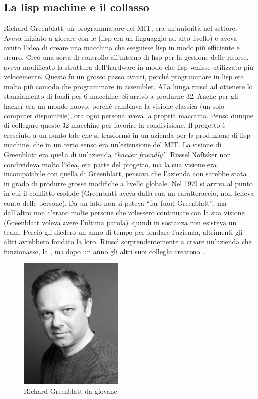 \subsection{La lisp machine e il collasso}

Richard Greenblatt, un programmatore del MIT, era un'autorità nel settore. Aveva iniziato a giocare con le  (lisp era un linguaggio ad alto livello) e aveva avuto l'idea di creare una macchina che eseguisse lisp in modo più efficiente e sicuro. Creò una sorta di controllo all'interno di lisp per la gestione delle risorse, aveva modificato la struttura dell'hardware in modo che lisp venisse utilizzato più velocemente. Questo fu un grosso passo avanti, perché programmare in lisp era molto più comodo che programmare in assembler. Alla lunga riuscì ad ottenere lo stanziamento di fondi per 6 macchine. Si arrivò a produrne 32. Anche per gli hacker era un mondo nuovo, perché cambiava la visione classica (un solo computer disponibile), ora ogni persona aveva la propria macchina. Pensò dunque di collegare queste 32 macchine per favorire la condivisione. Il progetto è cresciuto a un punto tale che si trasformò in un azienda per la produzione di lisp machine, che in un certo senso era un'estensione del MIT. La visione di Greenblatt era quella di un'azienda \textit{``hacker friendly''}. Russel Noftsker non condivideva molto l'idea, era parte del progetto, ma la sua visione era incompatibile con quella di Greenblatt, pensava che l'azienda non sarebbe stata in grado di produrre grosse modifiche a livello globale.
Nel 1979 si arriva al punto in cui il conflitto esplode (Greenblatt aveva dalla sua un caratteraccio, non teneva conto delle persone). Da un lato non si poteva ``far fuori Greenblatt'', ma dall'altro non c'erano molte persone che volessero continuare con la sua visione (Greenblatt voleva avere l'ultima parola), quindi in sostanza non esisteva un team. Perciò gli diedero un anno di tempo per fondare l'azienda, altrimenti gli altri avrebbero fondato la loro. Riuscì sorprendentemente a creare un'azienda che funzionasse, la , ma dopo un anno gli altri suoi colleghi crearono .

\begin{figure}[htbp]
\centering
\includegraphics[width=50mm]{images/greenblatt.jpg}
\caption{Richard Greenblatt da giovane}
\end{figure}

